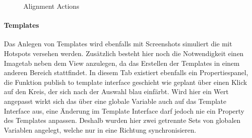 \begin{figure}%
\centering
{}%
\qquad
{}%

\caption{Alignment Actions}%
\label{fig:Prototyp_06}
\end{figure}

\paragraph{Templates}
Das Anlegen von Templates wird ebenfalls mit Screenshots simuliert die mit Hotspots versehen werden.
Zusätzlich besteht hier noch die Notwendigkeit einen Imagetab neben dem View anzulegen, da das Erstellen der Templates in einem anderen Bereich stattfindet.
In diesem Tab existiert ebenfalls ein Propertiespanel, die Funktion \glqq publish to template interface\grqq{} geschieht wie geplant über einen Klick auf den Kreis, der sich nach der Auswahl blau einfärbt.
Wird hier ein Wert angepasst wirkt sich das über eine globale Variable auch auf das Template Interface aus, eine Änderung im Template Interface darf jedoch nie ein Property des Templates anpassen.
Deshalb wurden hier zwei getrennte Sets von globalen Variablen angelegt, welche nur in eine Richtung synchronisieren.

